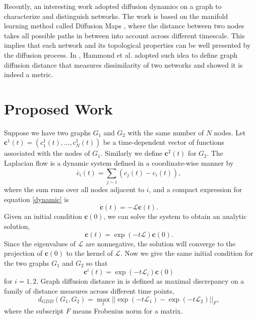 \documentclass{amsart}
\begin{document}
Recently, an interesting work adopted diffusion dynamics on a graph to characterize and distinguish networks. The work is based on the manifold learning method called Diffusion Maps \cite{coifman_geometric_2005}, where the distance between two nodes takes all possible paths in between into account across different timescale. This implies that each network and its topological properties can be well presented by the diffusion process. In \cite{hammond2013graph}, Hammond et al. adopted such idea to define graph diffusion distance that measures dissimilarity of two networks and showed it is indeed a metric. 









\section{Proposed Work}	\label{work}



Suppose we have two graphs $G_1$ and $G_2$ with the same number of $N$ nodes. Let $\textbf{c}^1(t)=(c^1_1(t),\dots, c^1_N(t))$ be a time-dependent vector of functions associated with the nodes of $G_1$. Similarly we define $\textbf{c}^2(t)$ for $G_2$. The Laplacian flow is a dynamic system defined in a coordinate-wise manner by 
\begin{equation}\label{dynamic}
\dot{c_i}(t)=\sum_{j\sim i}(c_j(t)-c_i(t)),
\end{equation}
where the sum runs over all nodes adjacent to $i$, and a compact expression for equation \eqref{dynamic} is
\begin{equation}\label{dynamicvector}
\dot{\textbf{c}}(t)=-\mathcal{L}\textbf{c}(t).
\end{equation}
Given an initial condition $\textbf{c}(0)$, we can solve the  system to obtain an analytic solution,
\begin{equation}\label{solution}
\textbf{c}(t)=\exp(-t\mathcal{L})\textbf{c}(0).
\end{equation}
Since the eigenvalues of $\mathcal{L}$ are nonnegative, the solution will converge to the projection of $\textbf{c}(0)$ to the kernel of $\mathcal{L}$. Now we give the same initial condition for the two graphs $G_1$ and $G_2$ so that 
\begin{equation}
\textbf{c}^i(t)=\exp(-t\mathcal{L}_i)\textbf{c}(0)
\end{equation}
for $i=1,2$. Graph diffusion distance in \cite{hammond2013graph} is defined as maximal discrepancy on a family of distance measures across different time points,
\begin{equation}\label{hammond}
d_{GDD}(G_1,G_2)=\max_{t}||\exp(-t\mathcal{L}_1)-\exp(-t\mathcal{L}_2)||_F,
\end{equation}
where the subscript $F$ means Frobenius norm for a matrix.
\end{document}
